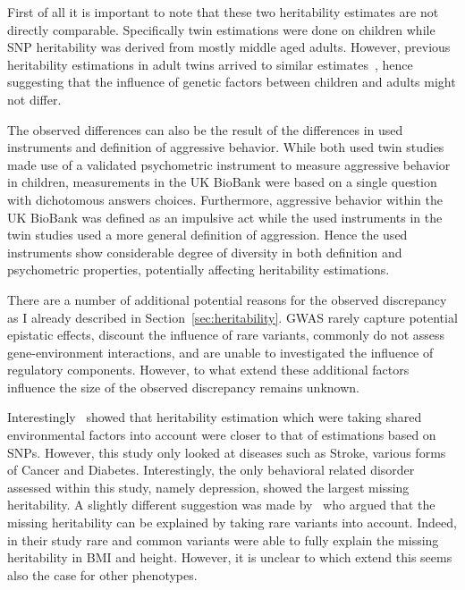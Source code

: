 First of all it is important to note that these two heritability estimates are not directly comparable.
Specifically twin estimations were done on children while SNP heritability was derived from mostly middle aged adults.
However, previous heritability estimations in adult twins arrived to similar estimates~\cite{Miles1997a}, hence suggesting that the influence of genetic factors between children and adults might not differ.

The observed differences can also be the result of the differences in used instruments and definition of aggressive behavior.
While both used twin studies made use of a validated psychometric instrument to measure aggressive behavior in children, measurements in the UK BioBank were based on a single question with dichotomous answers choices.
Furthermore, aggressive behavior within the UK BioBank was defined as an impulsive act while the used instruments in the twin studies used a more general definition of aggression.
Hence the used instruments show considerable degree of diversity in both definition and psychometric properties, potentially affecting heritability estimations.

There are a number of additional potential reasons for the observed discrepancy as I already described in Section~\ref{sec:heritability}.
GWAS rarely capture potential epistatic effects, discount the influence of rare variants, commonly do not assess gene-environment interactions, and are unable to investigated the influence of regulatory components. 
However, to what extend these additional factors influence the size of the observed discrepancy remains unknown.

Interestingly~\citet{Munoz2016a} showed that heritability estimation which were taking shared environmental factors into account were closer to that of estimations based on SNPs.
However, this study only looked at diseases such as Stroke, various forms of Cancer and Diabetes.
Interestingly, the only behavioral related disorder assessed within this study, namely depression, showed the largest missing heritability.
A slightly different suggestion was made by~\citet{Yang2015} who argued that the missing heritability can be explained by taking rare variants into account.
Indeed, in their study rare and common variants were able to fully explain the missing heritability in BMI and height.
However, it is unclear to which extend this seems also the case for other phenotypes.

